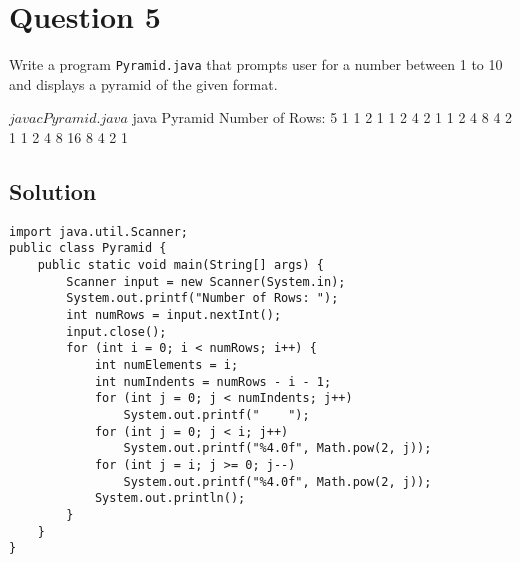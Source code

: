 \newpage

\section*{Question 5}
Write a program \texttt{Pyramid.java} that prompts user for a number between 1 to 10 and displays a pyramid of the given format.

\begin{terminal}
$ javac Pyramid.java
$ java Pyramid
Number of Rows: 5
                   1
               1   2   1
           1   2   4   2   1
       1   2   4   8   4   2   1
   1   2   4   8  16   8   4   2   1
\end{terminal}

\subsection*{Solution}
\lstset{language=Java,tabsize=2}
\begin{lstlisting}
import java.util.Scanner;
public class Pyramid {
	public static void main(String[] args) {
		Scanner input = new Scanner(System.in);
		System.out.printf("Number of Rows: ");
		int numRows = input.nextInt();
		input.close();
		for (int i = 0; i < numRows; i++) {
			int numElements = i;
			int numIndents = numRows - i - 1;
			for (int j = 0; j < numIndents; j++)
				System.out.printf("    ");
			for (int j = 0; j < i; j++)
				System.out.printf("%4.0f", Math.pow(2, j));
			for (int j = i; j >= 0; j--)
				System.out.printf("%4.0f", Math.pow(2, j));
			System.out.println();
		}
	}
}
\end{lstlisting}

\newpage
